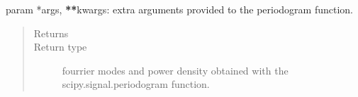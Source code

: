 \documentclass[letterpaper,10pt,english]{sphinxmanual}
\begin{document}
\begin{fulllineitems}
\begin{fulllineitems}
\begin{quote}
\begin{description}
\end{description}\end{quote}

\end{fulllineitems}


\begin{fulllineitems}
\label{\detokenize{triflow.plugins:triflow.plugins.signals.Signal.fourrier_spectrum}}
param *args, {\color{red}\bfseries{}**}kwargs: extra arguments provided to the periodogram function.
\begin{quote}\begin{description}
\item[{Returns}] \leavevmode
{}

\item[{Return type}] \leavevmode
fourrier modes and power density obtained with the scipy.signal.periodogram function.

\end{description}\end{quote}

\end{fulllineitems}


\end{fulllineitems}

\end{document}
